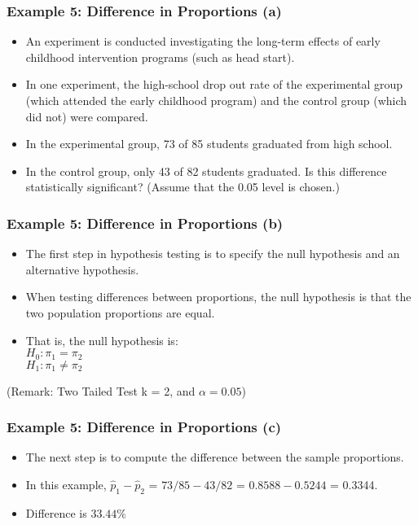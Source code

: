 
\begin{frame}
\frametitle{Example 5: Difference in Proportions (a)}
\begin{itemize}
\item An experiment is conducted investigating the long-term effects of early childhood intervention programs (such as head start).
\item In one experiment, the high-school drop out rate of the experimental group (which attended the early childhood program)
 and the control group (which did not) were compared.
\item In the experimental group, 73 of 85 students graduated from high school. \item In the control group, only 43 of 82 students graduated.
Is this difference statistically significant? (Assume that the 0.05 level is chosen.) \end{itemize}
\end{frame}

\begin{frame}
\frametitle{Example 5: Difference in Proportions (b)}
\begin{itemize}
\item
The first step in hypothesis testing is to specify the null hypothesis and an alternative hypothesis.
\item When testing differences between proportions, the null hypothesis is that the two population proportions are equal.
\item That is, the null hypothesis is:\\
$H_0: \pi_1 = \pi_2$\\
$H_1: \pi_1 \neq \pi_2$\\
\end{itemize}
(Remark: Two Tailed Test k = 2, and $\alpha = 0.05$)
\end{frame}
\begin{frame}
\frametitle{Example 5: Difference in Proportions (c)}
\begin{itemize}
\item The next step is to compute the difference between the sample proportions.
\item In this example, $\hat{p}_1 - \hat{p}_2$ = $73/85 - 43/82$ = $0.8588 - 0.5244$ = 0.3344.
\item Difference is $33.44\%$
\end{itemize}
\end{frame}



